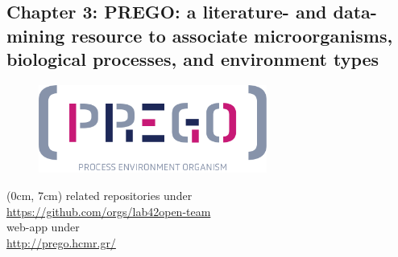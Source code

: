 \documentclass{beamer}
\begin{document}

   \begin{darkframes}
      \section{
         \textbf{Chapter 3:} PREGO: a literature- and data-mining
         resource to associate microorganisms,
         biological processes, and
         environment types
      }
   \end{darkframes}

   \begin{frame}
      
      \begin{figure}
         \includegraphics[width=75mm]{resources/prego_logo.png}
      \end{figure}

      \begin{textblock*}{12cm}(0cm, 7cm)
         \centering
         \small related repositories under \\
         \small \href{https://github.com/orgs/lab42open-team}{https://github.com/orgs/lab42open-team} \\ 
         \small web-app under\\
         \small \href{http://prego.hcmr.gr/}{http://prego.hcmr.gr/}
      \end{textblock*}

   \end{frame}
   \fi
\end{document}
